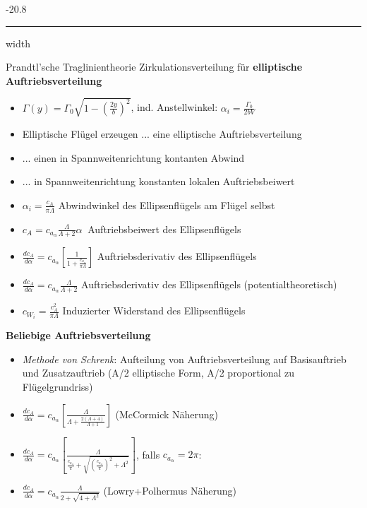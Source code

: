 \documentclass[8pt, landscape, fleqn]{scrartcl}
\makeatletter
\renewcommand{\subsubsection}{\@startsection{subsubsection}{1}{0mm}%
{-2\baselineskip}{0.8\baselineskip}%
{\hrule depth 0.2pt width\columnwidth\vspace*{1.2em}\normalsize\bfseries\rmfamily}}
\makeatother
\begin{document}
\begin{multicols*}{3}
\subsubsection{Prandtl'sche Traglinientheorie}
Zirkulationsverteilung für \textbf{elliptische Auftriebsverteilung}
\begin{itemize}
    \item $\Gamma(y) = \Gamma_0 \sqrt{1-\left(\frac{2y}{b}\right)^2}$, ind. Anstellwinkel: $\alpha_i = \frac{\Gamma_0}{2bV}$
    \item Elliptische Flügel erzeugen ... eine elliptische Auftriebsverteilung 
    \item ... einen in Spannweitenrichtung kontanten Abwind
    \item ... in Spannweitenrichtung konstanten lokalen Auftriebsbeiwert
    \item $\alpha_i = \frac{c_A}{\pi \Lambda}$ Abwindwinkel des Ellipsenflügels am Flügel selbst
    \item $c_A = c_{a_\alpha}\frac{\Lambda}{\Lambda+2}\alpha~$ Auftriebsbeiwert des Ellipsenflügels
    \item $\frac{d c_A}{d \alpha} = c_{a_\alpha}\left[\frac{1}{1+\frac{c_{a_\alpha}}{\pi \Lambda}}\right]$ Auftriebsderivativ des Ellipsenflügels
    \item $\frac{d c_A}{d \alpha} = c_{a_\alpha}\frac{\Lambda}{\Lambda+2}$ Auftriebsderivativ des Ellipsenflügels (potentialtheoretisch)
    \item $c_{W_i}=\frac{c_A^2}{\pi \Lambda}$ Induzierter Widerstand des Ellipsenflügels
\end{itemize}
\textbf{Beliebige Auftriebsverteilung}
\begin{itemize}
    \item \emph{Methode von Schrenk}: Aufteilung von Auftriebsverteilung auf Basisauftrieb und Zusatzauftrieb (A/2 elliptische Form, A/2 proportional zu Flügelgrundriss)
    \item $\frac{dc_A}{d\alpha} = c_{a_\alpha}\left[\frac{\Lambda}{\Lambda+\frac{2(\Lambda+4)}{\Lambda+1}}\right]$ (McCormick Näherung)
    \item $\frac{dc_A}{d\alpha} = c_{a_\alpha}\left[\frac{\Lambda}{\frac{c_{a_\alpha}}{\pi}+\sqrt{\left(\frac{c_{a_\alpha}}{\pi}\right)^2+\Lambda^2}}\right]$, falls $c_{a_\alpha} = 2 \pi $:
    \item $\frac{dc_A}{d\alpha} = c_{a_\alpha}\frac{\Lambda}{2+\sqrt{4+\Lambda^2}}$ (Lowry+Polhermus Näherung)
\end{itemize}


\end{multicols*}
\end{document}
